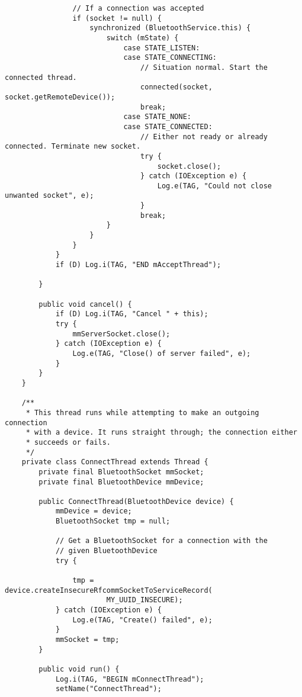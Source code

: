 \begin{verbatim}
                // If a connection was accepted
                if (socket != null) {
                    synchronized (BluetoothService.this) {
                        switch (mState) {
                            case STATE_LISTEN:
                            case STATE_CONNECTING:
                                // Situation normal. Start the connected thread.
                                connected(socket, socket.getRemoteDevice());
                                break;
                            case STATE_NONE:
                            case STATE_CONNECTED:
                                // Either not ready or already connected. Terminate new socket.
                                try {
                                    socket.close();
                                } catch (IOException e) {
                                    Log.e(TAG, "Could not close unwanted socket", e);
                                }
                                break;
                        }
                    }
                }
            }
            if (D) Log.i(TAG, "END mAcceptThread");

        }

        public void cancel() {
            if (D) Log.i(TAG, "Cancel " + this);
            try {
                mmServerSocket.close();
            } catch (IOException e) {
                Log.e(TAG, "Close() of server failed", e);
            }
        }
    }

    /**
     * This thread runs while attempting to make an outgoing connection
     * with a device. It runs straight through; the connection either
     * succeeds or fails.
     */
    private class ConnectThread extends Thread {
        private final BluetoothSocket mmSocket;
        private final BluetoothDevice mmDevice;

        public ConnectThread(BluetoothDevice device) {
            mmDevice = device;
            BluetoothSocket tmp = null;

            // Get a BluetoothSocket for a connection with the
            // given BluetoothDevice
            try {

                tmp = device.createInsecureRfcommSocketToServiceRecord(
                        MY_UUID_INSECURE);
            } catch (IOException e) {
                Log.e(TAG, "Create() failed", e);
            }
            mmSocket = tmp;
        }

        public void run() {
            Log.i(TAG, "BEGIN mConnectThread");
            setName("ConnectThread");


\end{verbatim}
